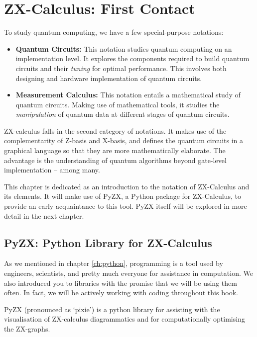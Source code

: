 \chapter{ZX-Calculus: First Contact}


To study quantum computing, we have a few special-purpose notations:
\begin{itemize}[leftmargin = *]
    \item \textbf{Quantum Circuits:} This notation studies quantum computing on an implementation level. It explores the components required to build quantum circuits and their \textit{tuning} for optimal performance. This involves both designing and hardware implementation of quantum circuits.   
    \item \textbf{Measurement Calculus:} This notation entails a mathematical study of quantum circuits. Making use of mathematical tools, it studies the \textit{manipulation} of quantum data at different stages of quantum circuits. 
\end{itemize}

ZX-calculus falls in the second category of notations. It makes use of the complementarity of Z-basis and X-basis, and defines the quantum circuits in a graphical language so that they are more mathematically elaborate. The advantage is the understanding of quantum algorithms beyond gate-level implementation -- among many.

This chapter is dedicated as an introduction to the notation of ZX-Calculus and its elements. It will make use of PyZX, a Python package for ZX-Calculus, to provide an early acquaintance to this tool. PyZX itself will be explored in more detail in the next chapter.  

\section{PyZX: Python Library for ZX-Calculus}
As we mentioned in chapter \ref{ch:python}, programming is a tool used by engineers, scientists, and pretty much everyone for assistance in computation. We also introduced you to libraries with the promise that we will be using them often. In fact, we will be actively working with coding throughout this book.

PyZX (pronounced as `pixie') is a python library for assisting with the visualisation of ZX-calculus diagrammatics and for computationally optimising the ZX-graphs.

